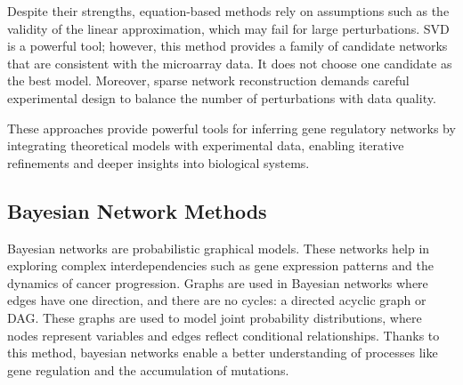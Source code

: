 \noindent Despite their strengths, equation-based methods rely on assumptions such as the validity of the linear approximation, which may fail for large perturbations.
SVD is a powerful tool; however, this method provides a family of candidate networks that are consistent with the microarray data.
It does not choose one candidate as the best model.
Moreover, sparse network reconstruction demands careful experimental design to balance the number of perturbations with data quality\cite{yeung_reverse_2002}.

\noindent These approaches provide powerful tools for inferring gene regulatory networks by integrating theoretical models with experimental data, enabling iterative refinements and deeper insights into biological systems.

\vfill
\subsection{Bayesian Network Methods}\label{subsec:bayesian-network-methods}

Bayesian networks are probabilistic graphical models.
These networks help in exploring complex interdependencies such as gene expression patterns and the dynamics of cancer progression\cite{friedman_using_2000, gerstung_quantifying_2009}.
Graphs are used in Bayesian networks where edges have one direction, and there are no cycles: a directed acyclic graph or DAG.
These graphs are used to model joint probability distributions, where nodes represent variables and edges reflect conditional relationships.
Thanks to this method, bayesian networks enable a better understanding of processes like gene regulation and the accumulation of mutations\cite{friedman_using_2000}.

